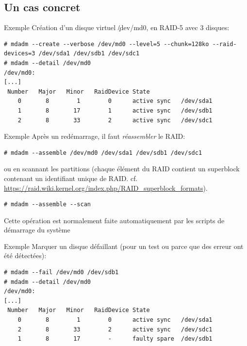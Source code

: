 \subsection{Un cas concret}

\begin{frame}[fragile=singleslide]{Exemple}
  Création d'un disque virtuel \c{/dev/md0}, en RAID-5 avec 3 disques:
  \begin{lstlisting}
# mdadm --create --verbose /dev/md0 --level=5 --chunk=128ko --raid-devices=3 /dev/sda1 /dev/sdb1 /dev/sdc1
# mdadm --detail /dev/md0
/dev/md0:
[...]
 Number   Major   Minor   RaidDevice State
    0       8        1        0      active sync   /dev/sda1
    1       8       17        1      active sync   /dev/sdb1
    2       8       33        2      active sync   /dev/sdc1
  \end{lstlisting}
\end{frame}

\begin{frame}[fragile=singleslide]{Exemple}
  Après un redémarrage, il faut \emph{réassembler} le RAID:
  \begin{lstlisting}
# mdadm --assemble /dev/md0 /dev/sda1 /dev/sdb1 /dev/sdc1
  \end{lstlisting}
  ou  en scannant  les partitions  (chaque élément  du RAID  contient un
  superblock      contenant     un      identifiant      unique     de
  RAID. cf. \url{https://raid.wiki.kernel.org/index.php/RAID_superblock_formats}).
  \begin{lstlisting}
# mdadm --assemble --scan
  \end{lstlisting}
  Cette  opération  est  normalement  faite  automatiquement  par  les
  scripts de démarrage du système
\end{frame}

\begin{frame}[fragile=singleslide]{Exemple}
  Marquer un disque  défaillant (pour un test ou  parce que des erreur
  ont été détectées):
  \begin{lstlisting}
# mdadm --fail /dev/md0 /dev/sdb1
# mdadm --detail /dev/md0
/dev/md0:
[...]
 Number   Major   Minor   RaidDevice State
    0       8        1        0      active sync   /dev/sda1
    2       8       33        2      active sync   /dev/sdc1
    1       8       17        -      faulty spare  /dev/sdb1
  \end{lstlisting}
\end{frame}

